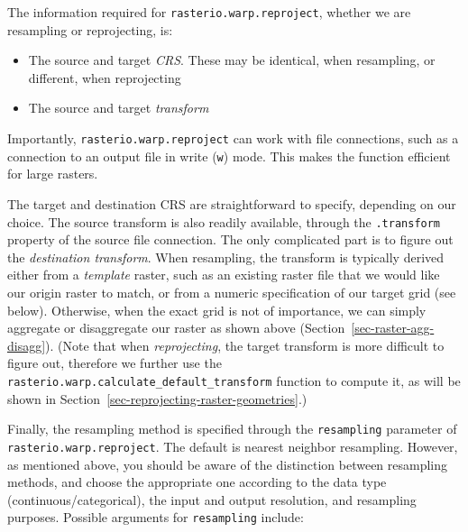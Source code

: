 \documentclass[
  letterpaper,
]{krantz}
\providecommand{\tightlist}{%
  \setlength{\itemsep}{0pt}\setlength{\parskip}{0pt}}\usepackage{longtable,booktabs,array}
\begin{document}
The information required for \texttt{rasterio.warp.reproject}, whether
we are resampling or reprojecting, is:

\begin{itemize}
\tightlist
\item
  The source and target \emph{CRS}. These may be identical, when
  resampling, or different, when reprojecting
\item
  The source and target \emph{transform}
\end{itemize}

Importantly, \texttt{rasterio.warp.reproject} can work with file
connections, such as a connection to an output file in write
(\texttt{\textquotesingle{}w\textquotesingle{}}) mode. This makes the
function efficient for large rasters.

The target and destination CRS are straightforward to specify, depending
on our choice. The source transform is also readily available, through
the \texttt{.transform} property of the source file connection. The only
complicated part is to figure out the \emph{destination transform}. When
resampling, the transform is typically derived either from a
\emph{template} raster, such as an existing raster file that we would
like our origin raster to match, or from a numeric specification of our
target grid (see below). Otherwise, when the exact grid is not of
importance, we can simply aggregate or disaggregate our raster as shown
above (Section~\ref{sec-raster-agg-disagg}). (Note that when
\emph{reprojecting}, the target transform is more difficult to figure
out, therefore we further use the
\texttt{rasterio.warp.calculate\_default\_transform} function to compute
it, as will be shown in
Section~\ref{sec-reprojecting-raster-geometries}.)

Finally, the resampling method is specified through the
\texttt{resampling} parameter of \texttt{rasterio.warp.reproject}. The
default is nearest neighbor resampling. However, as mentioned above, you
should be aware of the distinction between resampling methods, and
choose the appropriate one according to the data type
(continuous/categorical), the input and output resolution, and
resampling purposes. Possible arguments for \texttt{resampling} include:
\end{document}
